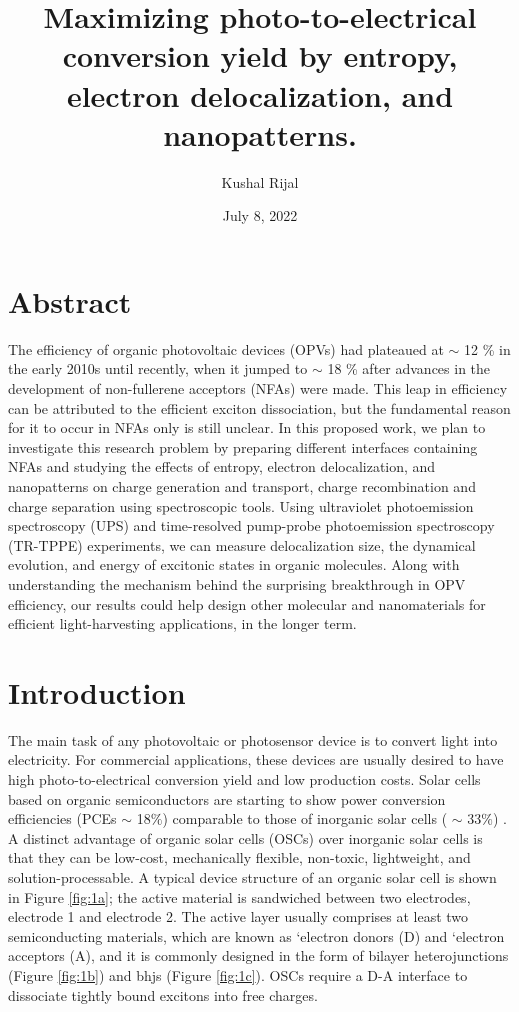 \documentclass[12pt]{article}
\title{Maximizing photo-to-electrical conversion yield by entropy, electron delocalization, and nanopatterns.}
\author{Kushal Rijal}
\date{July 8, 2022}
\begin{document}
\maketitle
\section*{\hfil Abstract\hfil}
The efficiency of organic photovoltaic devices (OPVs) had plateaued at $\sim$ 12 \% in the early 2010s until recently, when it jumped to $\sim$ 18 \% after advances in the development of non-fullerene acceptors (NFAs) were made. This leap in efficiency can be attributed to the efficient exciton dissociation, but the fundamental reason for it to occur in NFAs only is still unclear. In this proposed work, we plan to investigate this research problem by preparing different interfaces containing NFAs and studying the effects of entropy, electron delocalization, and nanopatterns on charge generation and transport, charge recombination and charge separation using spectroscopic tools. Using ultraviolet photoemission spectroscopy (UPS) and time-resolved pump-probe photoemission spectroscopy (TR-TPPE) experiments, we can measure delocalization size, the dynamical evolution, and energy of excitonic states in organic molecules. Along with understanding the mechanism behind the surprising breakthrough in OPV efficiency, our results could help design other molecular and nanomaterials for efficient light-harvesting applications, in the longer term. 

\section{Introduction}
The main task of any photovoltaic or photosensor device is to convert light into electricity. For commercial applications, these devices are usually desired to have high photo-to-electrical conversion yield and low production costs. Solar cells based on organic semiconductors are starting to show power conversion efficiencies (PCEs $\sim$ 18$\%$) comparable to those of inorganic solar cells ( $\sim$ 33$\%$) \cite{hou2018organic,cariou2018iii}. A distinct advantage of organic solar cells (OSCs) over inorganic solar cells is that they can be low-cost, mechanically flexible, non-toxic, lightweight, and solution-processable. A typical device structure of an organic solar cell is shown in Figure \ref{fig:1a}; the active material is sandwiched between two electrodes, electrode 1 and electrode 2. The active layer usually comprises at least two semiconducting materials, which are known as \lq{electron donors} (D) and \lq{electron acceptors} (A), and it is commonly designed in the form of bilayer heterojunctions (Figure \ref{fig:1b}) and \acrfull{bhjs} (Figure \ref{fig:1c}). OSCs require a D-A interface to dissociate tightly bound excitons into free charges.
 
\end{document}
